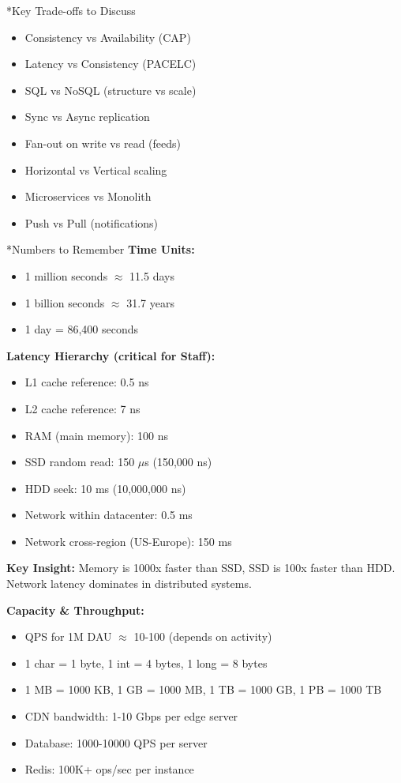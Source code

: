 \documentclass[8pt,landscape]{extarticle}
\makeatletter
\renewcommand{\subsection}{\@startsection{subsection}{2}{0pt}{3pt}{1pt}{\normalfont\normalsize\bfseries}}
\makeatother
\begin{document}
\begin{multicols*}{3}
\subsection*{Key Trade-offs to Discuss}
\begin{itemize}
\item Consistency vs Availability (CAP)
\item Latency vs Consistency (PACELC)
\item SQL vs NoSQL (structure vs scale)
\item Sync vs Async replication
\item Fan-out on write vs read (feeds)
\item Horizontal vs Vertical scaling
\item Microservices vs Monolith
\item Push vs Pull (notifications)
\end{itemize}

\subsection*{Numbers to Remember}
\textbf{Time Units:}
\begin{itemize}
\item 1 million seconds $\approx$ 11.5 days
\item 1 billion seconds $\approx$ 31.7 years
\item 1 day = 86,400 seconds
\end{itemize}
\textbf{Latency Hierarchy (critical for Staff):}
\begin{itemize}
\item L1 cache reference: 0.5 ns
\item L2 cache reference: 7 ns
\item RAM (main memory): 100 ns
\item SSD random read: 150 $\mu$s (150,000 ns)
\item HDD seek: 10 ms (10,000,000 ns)
\item Network within datacenter: 0.5 ms
\item Network cross-region (US-Europe): 150 ms
\end{itemize}
\textbf{Key Insight:} Memory is 1000x faster than SSD, SSD is 100x faster than HDD. \\
Network latency dominates in distributed systems.
\vspace{2pt}

\textbf{Capacity \& Throughput:}
\begin{itemize}
\item QPS for 1M DAU $\approx$ 10-100 (depends on activity)
\item 1 char = 1 byte, 1 int = 4 bytes, 1 long = 8 bytes
\item 1 MB = 1000 KB, 1 GB = 1000 MB, 1 TB = 1000 GB, 1 PB = 1000 TB
\item CDN bandwidth: 1-10 Gbps per edge server
\item Database: 1000-10000 QPS per server
\item Redis: 100K+ ops/sec per instance
\end{itemize}


\end{multicols*}
\end{document}
